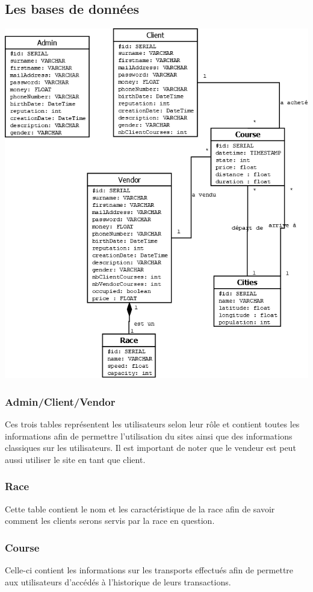 \documentclass{article}
\begin{document}
	\subsection{Les bases de données}
		\includegraphics[scale=0.3]{diagrammeTotal.png} \\
		\subsubsection{Admin/Client/Vendor}
			Ces trois tables représentent les utilisateurs selon leur rôle et contient toutes les informations afin de permettre l'utilisation du sites ainsi que des informations classiques sur les utilisateurs. Il est important de noter que le vendeur est peut aussi utiliser le site en tant que client.
		\subsubsection{Race}
			Cette table contient le nom et les caractéristique de la race afin de savoir comment les clients serons servis par la race en question.
		\subsubsection{Course}
			Celle-ci contient les informations sur les transports effectués afin de permettre aux utilisateurs d'accédés à l'historique de leurs transactions.
\end{document}
